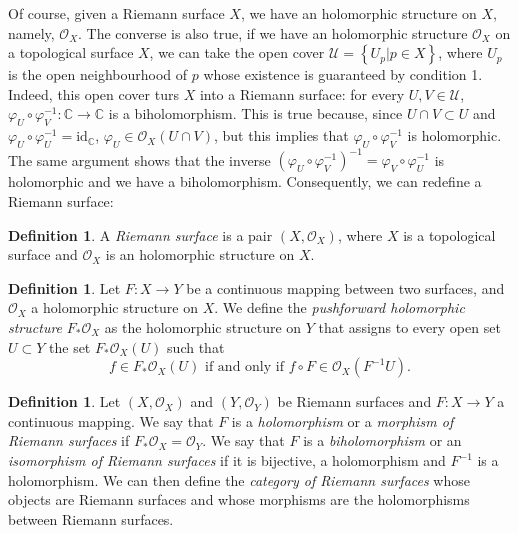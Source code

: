 \documentclass[12pt,a4paper]{book}
\theoremstyle{definition} \newtheorem{defn}[thm]{Definition}
\theoremstyle{definition} \newtheorem{ejemplo}[thm]{Example}
\theoremstyle{definition} \newtheorem{ejercicio}[thm]{Exercise}
\theoremstyle{remark} \newtheorem*{obs}{Remark}
\def\CC{\mathbb{C}}
\def\id{\mathrm{id}}
\def\OO{\mathscr{O}}
\begin{document}
Of course, given a Riemann surface $X$, we have an holomorphic structure on $X$, namely, $\OO_X$. The converse is also true, if we have an holomorphic structure $\OO_X$ on a topological surface $X$, we can take the open cover $\mathcal{U}=\left\{ U_p |p\in X \right\}$, where $U_p$ is the open neighbourhood of $p$ whose existence is guaranteed by condition 1. Indeed, this open cover turs $X$ into a Riemann surface: for every $U,V \in \mathcal{U}$, $\varphi_U \circ \varphi_V^{-1}:\CC \rightarrow \CC$ is a biholomorphism. This is true because, since $U\cap V \subset U$ and $\varphi_U \circ \varphi_U^{-1}=\id_\CC$, $\varphi_U \in \OO_X(U\cap V)$, but this implies that $\varphi_U \circ \varphi_V^{-1}$ is holomorphic. The same argument shows that the inverse $(\varphi_U \circ \varphi_V^{-1})^{-1}=\varphi_V \circ \varphi_U^{-1}$ is holomorphic and we have a biholomorphism. Consequently, we can redefine a Riemann surface:
\begin{defn}
  A \emph{Riemann surface} is a pair $(X,\OO_X)$, where $X$ is a topological surface and $\OO_X$ is an holomorphic structure on $X$.
\end{defn}

\begin{defn}
  Let $F:X\rightarrow Y$ be a continuous mapping between two surfaces, and $\OO_X$ a holomorphic structure on $X$. We define the \emph{pushforward holomorphic structure} $F_*\OO_X$ as the holomorphic structure on $Y$ that assigns to every open set $U\subset Y$ the set $F_*\OO_X(U)$ such that
  \begin{equation*}
    f \in F_*\OO_X(U) \text{ if and only if } f\circ F \in \OO_X(F^{-1}U).
  \end{equation*}
\end{defn}

\begin{defn}
  Let $(X,\OO_X)$ and $(Y,\OO_Y)$ be Riemann surfaces and $F:X\rightarrow Y$ a continuous mapping. We say that $F$ is a \emph{holomorphism} or a \emph{morphism of Riemann surfaces} if $F_*\OO_X = \OO_Y$. We say that $F$ is a \emph{biholomorphism} or an \emph{isomorphism of Riemann surfaces} if it is bijective, a holomorphism and $F^{-1}$ is a holomorphism. We can then define the \emph{category of Riemann surfaces} whose objects are Riemann surfaces and whose morphisms are the holomorphisms between Riemann surfaces.
\end{defn}
\end{document}
